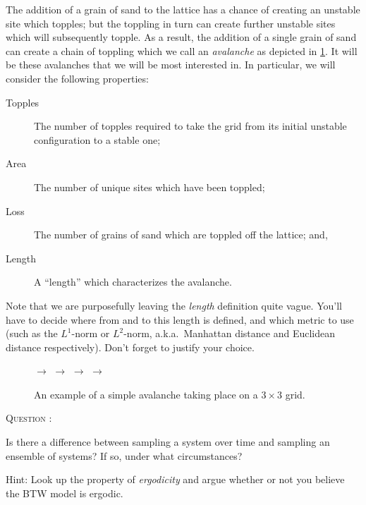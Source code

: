 \documentclass[
  a4paper,             %
  11pt,                %
  oneside,             %
  onecolumn,           %
  bibliography=totoc,  %
  final,               %
]{scrartcl}
\newcounter{question}
\newenvironment{question}{%
  \stepcounter{question}%
  \begin{tcolorbox}[
      colframe=black,
      sharp corners=all,
      boxsep=0.5ex,
    ]
    \noindent\textsc{\large Question \arabic{question}:} %
}{%
  \end{tcolorbox}%
}
\begin{document}
The addition of a grain of sand to the lattice has a chance of creating an
unstable site which topples; but the toppling in turn can create further
unstable sites which will subsequently topple.  As a result, the addition of a
single grain of sand can create a chain of toppling which we call an
\emph{avalanche} as depicted in \cref{fig:avalanche}.  It will be these
avalanches that we will be most interested in.  In particular, we will consider
the following properties:
\begin{description}
  \item[Topples] The number of topples required to take the grid from its initial
        unstable configuration to a stable one;
  \item[Area] The number of unique sites which have been toppled;
  \item[Loss] The number of grains of sand which are toppled off the lattice; and,
  \item[Length] A \enquote{length} which characterizes the avalanche.
\end{description}

Note that we are purposefully leaving the \emph{length} definition quite vague.
You'll have to decide where from and to this length is defined, and which metric
to use (such as the \(L^{1}\)-norm or \(L^{2}\)-norm, a.k.a.~Manhattan distance
and Euclidean distance respectively).  Don't forget to justify your choice.

\begin{figure}
  \centering
  \renewcommand{\arraystretch}{1.2}
  \(\rightarrow\)
  \(\rightarrow\)
  \(\rightarrow\)
  \(\rightarrow\)
  \caption{An example of a simple avalanche taking place on a \(3 \times 3\)
    grid.}
  \label{fig:avalanche}
\end{figure}

\begin{question}
  Is there a difference between sampling a system over time and sampling an
  ensemble of systems?  If so, under what circumstances?

  Hint: Look up the property of \emph{ergodicity} and argue whether or not you
  believe the \gls{BTW} model is ergodic.
\end{question}
\end{document}
